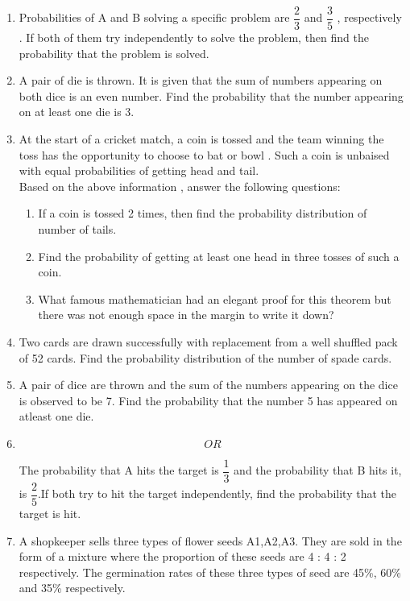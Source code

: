\documentclass[a4paper,12pt]{article}
\begin{document}
\begin{enumerate}
\item Probabilities of A and B solving a specific problem are $ \dfrac{2}{3} $ and $ \dfrac{3}{5} $ , respectively . If both of them try independently to solve the problem, then find the probability that the problem is solved.

\item A pair of die is thrown. It is given that the sum of numbers appearing on both dice is an even number. Find the probability that the number appearing on at least one die is 3.

\item At the start of a cricket match, a coin is tossed and the team winning the toss has the opportunity to choose to bat or bowl . Such a coin is unbaised with equal probabilities of getting head and tail.\\
Based on the above information , answer the following questions:

\begin{enumerate}
\item If a coin is tossed 2 times, then find  the probability distribution of number of tails. 

\item Find the probability of getting at least one head in three tosses of such a coin.


\item What famous mathematician had an elegant proof for this theorem but
there was not enough space in the margin to write it down?


\end{enumerate}

\item Two cards are drawn successfully with replacement from a well shuffled pack of 52 cards. Find the probability distribution of the number of spade cards.

\item A pair of dice are thrown and the sum of the numbers appearing on the dice is observed to be 7. Find the probability that the number 5 has appeared on atleast one die.

\item [ ]$$ OR $$

The probability that A hits the target is $ \dfrac{1}{3} $ and the probability that B hits it, is $ \dfrac{2}{5} $.If both try to hit the target independently, find the probability that the target is hit.\\

\item A shopkeeper sells three types of flower seeds A1,A2,A3. They are sold in the form of a mixture where the proportion of these seeds are 4 : 4 : 2 respectively. The germination rates of these three types of seed are 45\%, 60\% and 35\% respectively. \


\end{enumerate}
\end{document}
